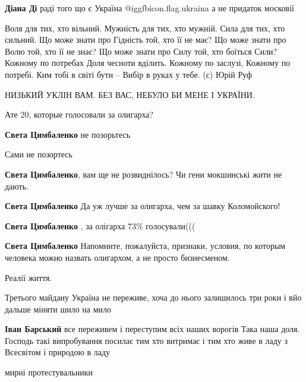 \begin{itemize}
\textbf{Діана Ді} раді того що є Україна @igg{fbicon.flag.ukraina} а не придаток московії


\obeycr
Воля для тих, хто вільний.
Мужність для тих, хто мужній.
Сила для тих, хто сильний.
Що може знати про Гідність той, хто її не має?
Що може знати про Волю той, хто її не знає?
Що може знати про Силу той, хто боїться Сили?
Кожному по потребах Доля чесноти вділить.
Кожному по заслузі,
Кожному по потребі.
Ким тобі в світі бути –
Вибір в руках у тебе.
(с) Юрій Руф
\restorecr

\end{itemize} %

НИЗЬКИЙ УКЛІН ВАМ.
БЕЗ ВАС, НЕБУЛО БИ МЕНЕ І УКРАЇНИ.

Ате 20, которые голосовали за олигарха?

\begin{itemize} %
\textbf{Света Цимбаленко} не позорьтесь

Сами не позортесь

\textbf{Света Цимбаленко}, вам ще не розвиднілось? Чи гени мокшинські жити не дають.

\textbf{Света Цимбаленко} Да уж лучше за олигарха, чем за шавку Коломойского!

\textbf{Света Цимбаленко} , за олігарха 73\% голосували(((

\textbf{Света Цимбаленко} Напомните, пожалуйста, признаки, условия, по которым человека можно назвать олигархом, а не просто бизнесменом.

\end{itemize} %

Реалії життя.

Третього майдану Україна не переживе, хоча до нього залишилось три роки і вйо дальше міняти шило на мило

\begin{itemize} %
\textbf{Іван Барський} все переживем і переступим всіх наших ворогів
Така наша доля. Господь такі випробування посилає тим хто витримає і тим хто живе в ладу з Всесвітом і природою в ладу
\end{itemize} %

мирні протестувальники


